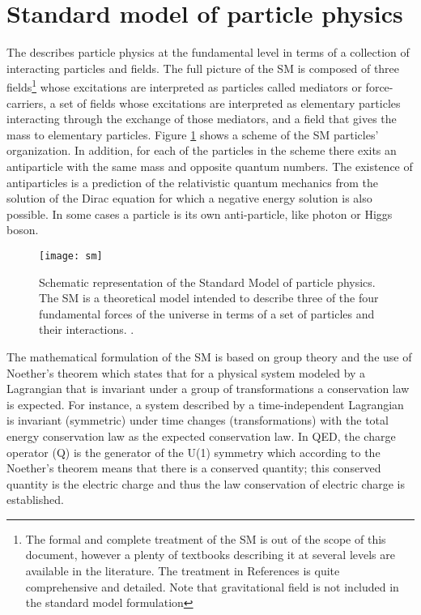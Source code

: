 \section{Standard model of particle physics}
\label{secc:SM}

The  describes particle physics at the fundamental level in terms of a collection of interacting particles and fields. The full picture of the SM is composed of three fields\footnote{The formal and complete treatment of the SM is out of the scope of this document, however a plenty of textbooks describing it at several levels are available in the literature. The treatment in References \cite{mandl,halzen} is quite comprehensive and detailed. Note that gravitational field is not included in the standard model formulation} whose excitations are interpreted as particles called mediators or force-carriers, a set of fields whose excitations are interpreted as elementary particles interacting through the exchange of those mediators, and a field that gives the mass to elementary particles. Figure \ref{sm} shows a scheme of the SM particles' organization. In addition, for each of the particles in the scheme there exits an antiparticle with the same mass and opposite quantum numbers. The existence of antiparticles is a prediction of the relativistic quantum mechanics from the solution of the Dirac equation for which a negative energy solution is also possible. In some cases a particle is its own anti-particle, like photon or Higgs boson.

\begin{figure}[h!]
  \centering
  \texttt{[image: sm]}
  \caption[Standard Model of particle physics.]{Schematic representation of the Standard Model of particle physics. The SM is a theoretical model intended to describe three of the four fundamental forces of the universe in terms of a set of particles and their interactions. \cite{smpicture}.}
  \label{sm}
\end{figure}

The mathematical formulation of the SM is based on group theory and the use of Noether's theorem\cite{noether} which states that for a physical system modeled by a Lagrangian that is invariant under a group of transformations a conservation law is expected. For instance, a system described by a time-independent Lagrangian is invariant (symmetric) under time changes (transformations) with the total energy conservation law as the expected conservation law. In QED, the charge operator (Q) is the generator of the U(1) symmetry which according to the Noether's theorem means that there is a conserved quantity; this conserved quantity is the electric charge and thus the law conservation of electric charge is established.

